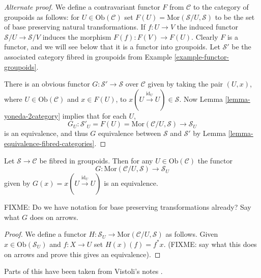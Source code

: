 \begin{proof}[Alternate proof]
We define a contravariant functor $F$ from $\mathcal{C}$ to the
category of groupoids as follows: for $U\in \text{Ob}(\mathcal{C})$
set $F(U) = \text{Mor}(\mathcal{S}/U,\mathcal{S})$ to be the set of
base preserving natural transformations.  If $f\colon U\to V$ the
induced functor $\mathcal{S}/U\to \mathcal{S}/V$ induces the
morphism $F(f)\colon F(V)\to F(U)$.  Clearly $F$ is a functor, and
we will see below that it is a functor into groupoids.  Let
$\mathcal{S}'$ be the associated category fibred in groupoids from Example
\ref{example-functor-groupoids}.

\smallskip\noindent
There is an obvious functor $G\colon \mathcal{S}'\to \mathcal{S}$
over $\mathcal{C}$ given by taking the pair $(U,x)$, where
$U\in\text{Ob}(\mathcal{C})$ and $x\in F(U)$, to
$x(U\stackrel{\text{id}_U}{\to} U) \in \mathcal{S}$.  Now Lemma
\ref{lemma-yoneda-2category} implies that for each $U$,
$$
G_U\colon \mathcal{S}'_U = F(U)= 
\text{Mor}(\mathcal{C}/U,\mathcal{S}) \to \mathcal{S}_U
$$
is an equivalence, and thus $G$ equivalence between $\mathcal{S}$ and
$\mathcal{S}'$ by Lemma \ref{lemma-equivalence-fibred-categories}.
\end{proof}

\begin{lemma}
\label{lemma-yoneda-2category}
Let $\mathcal{S}\to \mathcal{C}$ be fibred in groupoids.  Then for any
$U\in \text{Ob}(\mathcal{C})$ the functor
$$
G\colon \text{Mor}(\mathcal{C}/U,\mathcal{S}) \to \mathcal{S}_U
$$
given by $G(x) = x(U\stackrel{\text{id}_U}{\to} U)$ is an equivalence.
\end{lemma}

\noindent
FIXME: Do we have notation for base preserving transformations already?
Say what $G$ does on arrows.

\begin{proof}
We define a functor $H\colon \mathcal{S}_U \to
\text{Mor}(\mathcal{C}/U,\mathcal{S})$ as follows.  Given $x\in
\text{Ob}(\mathcal{S}_U)$ and $f\colon X\to U$ set $H(x)(f) = f^*x$.
(FIXME: say what this does on arrows and prove this gives an
equivalence).
\end{proof}
 
 Parts of this have been taken from
Vistoli's notes \cite{Vis2}.







